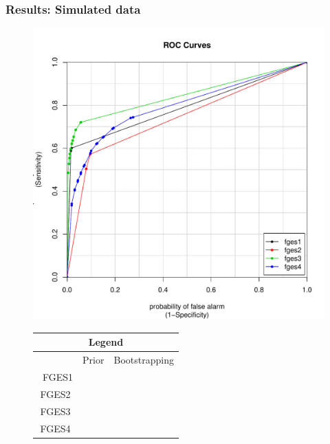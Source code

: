 \documentclass[10pt, compress]{beamer}
\newcommand{\cmark}{\ding{51}}%
\newcommand{\xmark}{\ding{55}}%
\begin{document}
\begin{frame}
    \frametitle{Results: Simulated data}
    \begin{figure}
        \centering
        \begin{minipage}{0.6\textwidth}
            \centering
            \includegraphics[width=\textwidth]{combinedSimCurvesfges}%
        \end{minipage}\hfill
        \begin{minipage}{0.4\textwidth}
            \centering
            \renewcommand{\arraystretch}{1}
            \setlength{\tabcolsep}{5pt}
            \begin{tabular}{|c|c|c|}
                \multicolumn{3}{c}{\large{\textbf{Legend}}}\\
                \hline
                       & Prior & Bootstrapping\\\
                 FGES1 & \cmark & \xmark\\
                 FGES2 & \xmark & \xmark\\
                 FGES3 & \cmark & \cmark \\
                 FGES4 & \xmark & \cmark\\
                 \hline
            \end{tabular}
        \end{minipage}
    \end{figure}
    
\end{frame}
\end{document}
